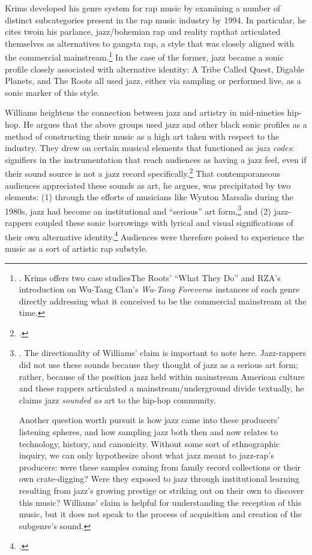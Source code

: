 Krims developed his genre system for rap music by examining a number of distinct subcategories present
in the rap music industry by 1994. In particular, he cites two\textemdash in his parlance, jazz/bohemian
rap and reality rap\textemdash that articulated themselves as alternatives to gangsta rap, a style that 
was closely aligned with the commercial mainstream.\footnote{
    \autocite[64--65]{adamkrimsRapMusicPoetics2000}. Krims offers two case studies\textemdash The Roots' 
    ``What They Do'' and RZA's introduction on Wu-Tang Clan's \textit{Wu-Tang Forever}\textemdash as 
    instances of each genre directly addressing what it conceived to be the commercial mainstream at
    the time.}
In the case of the former, jazz became a sonic profile closely associated with alternative identity:
A Tribe Called Quest, Digable Planets, and The Roots all used jazz, either via sampling or performed
live, as a sonic marker of this style.

Williams heightens the connection between jazz and artistry in mid-nineties hip-hop. He argues that 
the above groups used jazz and other black sonic profiles as a method of constructing their music as
a high art taken with respect to the industry. They drew on certain musical elements that functioned
as \emph{jazz codes}: signifiers in the instrumentation that reach audiences as having a jazz feel,
even if their sound source is not a jazz record specifically.\footnote{
    \autocite[55]{justinawilliamsRhyminStealinMusical2013}.}
That contemporaneous audiences appreciated these sounds as art, he argues, was precipitated by two 
elements: (1) through the efforts of musicians like Wynton Marsalis during the 1980s, jazz had become
an institutional and  ``serious'' art form,\footnote{
    \autocite[48--52]{justinawilliamsRhyminStealinMusical2013}. The directionality of Williams' claim 
    is important to note here. Jazz-rappers did not use these sounds because they thought of jazz as a
    serious art form; rather, because of the position jazz held within mainstream American culture and
    these rappers articulated a mainstream/underground divide textually, he claims jazz \emph{sounded 
    as} art to the hip-hop community.
    
    Another question worth pursuit is how jazz came into these producers' listening spheres, and how sampling
    jazz both then and now relates to technology, history, and canonicity. Without some sort of ethnographic 
    inquiry, we can only hypothesize about what jazz meant to jazz-rap's producers: were these samples coming
    from family record collections or their own crate-digging? Were they exposed to jazz through institutional 
    learning resulting from jazz's growing prestige or striking out on their own to discover this music? 
    Williams' claim is helpful for understanding the reception of this music, but it does not speak to the 
    process of acquisition and creation of the subgenre's sound.} 
and (2) jazz-rappers coupled these sonic borrowings with lyrical and visual significations of their 
own alternative identity.\footnote{
    \autocite[55--64]{justinawilliamsRhyminStealinMusical2013}.}
Audiences were therefore poised to experience the music as a sort of artistic rap substyle.

